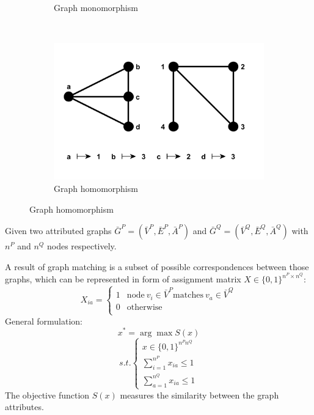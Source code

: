 \documentclass[hyperref={pdfpagelabels=false}]{beamer}
\begin{document}
\begin{frame}
\begin{figure}[h!]
\begin{subfigure}[b]{0.3\textwidth}
        \caption{Graph monomorphism}
        \label{fig:monomorphism}
    \end{subfigure}
    ~
    \begin{subfigure}[b]{0.3\textwidth}
        \includegraphics[width=\textwidth]{fig/homomorphism}
        \caption{Graph homomorphism}
        \label{fig:homomorphism}
    \end{subfigure}
\end{figure}

\end{frame}

\begin{frame}
Given two attributed graphs $\bar{G}^P=(\bar{V}^P, \bar{E}^P, \bar{A}^P)$ and $\bar{G}^Q=(\bar{V}^Q, \bar{E}^Q, \bar{A}^Q)$ with $n^P$ and $n^Q$ nodes respectively.

A result of graph matching is a subset of possible correspondences between those graphs, which can be represented in form of assignment matrix $X\in\{0,1\}^{n^P\times n^Q}$:
$$X_{ia} = \begin{cases} 1 & \mbox{node}\ v_i\in \bar{V}^P \mbox{matches}\ v_a \in \bar{V}^Q \\
						 0 & \mbox{otherwise} \\
			\end{cases}$$
General formulation:
$$x^* = \arg\max S(x)$$
$$ s.t. \begin{cases}
									x\in\{0,1\}^{n^Pn^Q} \\
								 \sum_{i=1}^{n^P}x_{ia}\le 1 \\
								 \sum_{a=1}^{n^Q}x_{ia}\le 1  \end{cases}$$
The objective function $S(x)$ measures the similarity between the graph attributes. 
\end{frame} 
\end{document}
